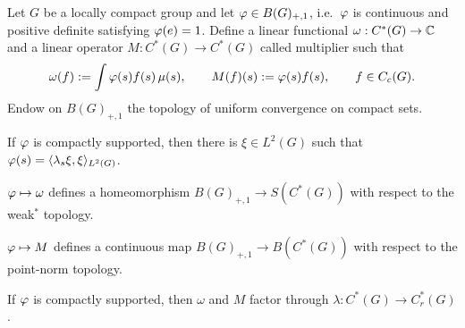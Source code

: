 \documentclass{../../small}
\begin{document}
\begin{prop}
Let $G$ be a locally compact group and let $\varphi\in B(G)_{+,1}$, i.e.~$\varphi$ is continuous and positive definite satisfying $\varphi(e)=1$.
Define a linear functional $\omega:C^*(G)\to\mathbb{C}$ and a linear operator $M:C^*(G)\to C^*(G)$ called multiplier such that
\[\omega(f):=\int\varphi(s)f(s)\,\mu(s),\qquad M(f)(s):=\varphi(s)f(s),\qquad f\in C_c(G).\]
Endow on $B(G)_{+,1}$ the topology of uniform convergence on compact sets.
\begin{parts}
\item If $\varphi$ is compactly supported, then there is $\xi\in L^2(G)$ such that $\varphi(s)=\langle\lambda_s\xi,\xi\rangle_{L^2(G)}$.
\item $\varphi\mapsto\omega$ defines a homeomorphism $B(G)_{+,1}\to S(C^*(G))$ with respect to the weak$^*$ topology.
\item $\varphi\mapsto M$ defines a continuous map $B(G)_{+,1}\to B(C^*(G))$ with respect to the point-norm topology.
\item If $\varphi$ is compactly supported, then $\omega$ and $M$ factor through $\lambda:C^*(G)\to C_r^*(G)$.
\end{parts}
\end{prop}
\end{document}
